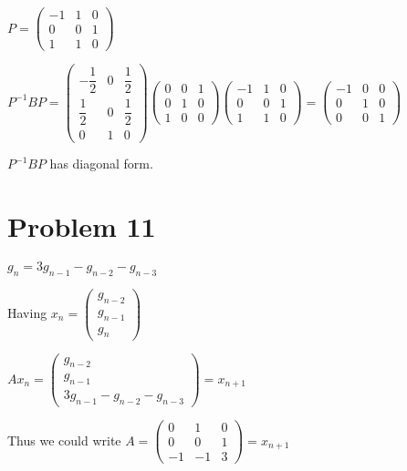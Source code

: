 \documentclass[12pt,letterpaper]{article}
\begin{document}
$P = \begin{pmatrix}
            -1 & 1 & 0 \\
            0 & 0 & 1 \\
            1 & 1 & 0
        \end{pmatrix}$

$P^{-1}BP = \begin{pmatrix}
            -\dfrac{1}{2} & 0 & \dfrac{1}{2} \\
            \dfrac{1}{2} & 0 & \dfrac{1}{2} \\
            0 & 1 & 0
        \end{pmatrix}\begin{pmatrix}
            0 & 0 & 1 \\
            0 & 1 & 0 \\
            1 & 0 & 0
        \end{pmatrix}\begin{pmatrix}
            -1 & 1 & 0 \\
            0 & 0 & 1 \\
            1 & 1 & 0
        \end{pmatrix} = \begin{pmatrix}
            -1 & 0 & 0 \\
            0 & 1 & 0 \\
            0 & 0 & 1
        \end{pmatrix}$

$P^{-1}BP$ has diagonal form.

\section*{Problem 11}
$g_n = 3g_{n-1} - g_{n-2} - g_{n-3}$

Having $x_n = \begin{pmatrix}
            g_{n-2} \\
            g_{n-1} \\
            g_n
        \end{pmatrix}$

$Ax_n = \begin{pmatrix}
            g_{n-2} \\
            g_{n-1} \\
            3g_{n-1} - g_{n-2} - g_{n-3}
        \end{pmatrix} = x_{n+1}$
        
Thus we could write $A = \begin{pmatrix}
            0 & 1 & 0 \\
            0 & 0 & 1 \\
            -1 & -1 & 3
        \end{pmatrix} = x_{n+1}$
\end{document}

